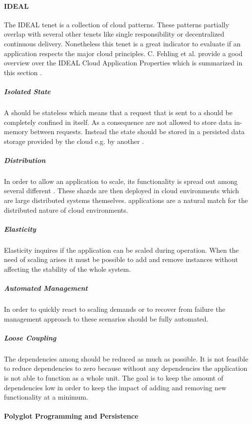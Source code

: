 \paragraph{IDEAL}

The IDEAL tenet is a collection of cloud patterns. These patterns partially
overlap with several other tenets like single responsibility or decentralized
continuous delivery. Nonetheless this tenet is a great indicator to evaluate
if an application respects the major cloud principles. C. Fehling et al. provide
a good overview over the  IDEAL Cloud Application Properties which is summarized
in this section \cite{fehling2015cloud}.

\subparagraph{Isolated State}
A \ms{} should be stateless which means that a request that is sent to a \ms{}
should be completely confined in itself. As a consequence \mss{} are not allowed
to store data in-memory between requests. Instead the state should be stored in
a persisted data storage provided by the cloud e.g. by another \ms{}.

\subparagraph{Distribution}
In order to allow an application to scale, its functionality is spread out among
several different \mss{}. These shards are then deployed in cloud environments
which are large distributed systems themselves. \msuc{} applications are a
natural match for the distributed nature of cloud environments.

\subparagraph{Elasticity}
Elasticity inquires if the application can be scaled during operation. When
the need of scaling arises it must be possible to add and remove \ms{} instances
without affecting the stability of the whole system.

\subparagraph{Automated Management}
In order to quickly react to scaling demands or to recover from failure the
management approach to these scenarios should be fully automated.

\subparagraph{Loose Coupling}

The dependencies among \mss{} should be reduced as much as possible. It is not
feasible to reduce dependencies to zero because without any dependencies the
application is not able to function as a whole unit. The goal is to keep the
amount of dependencies low in order to keep the impact of adding and removing
new functionality at a minimum.

\paragraph{Polyglot Programming and Persistence}

